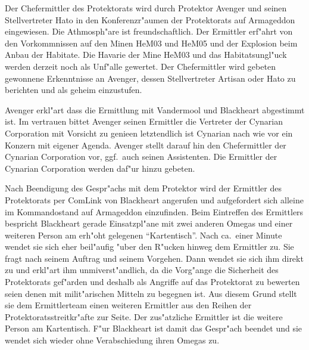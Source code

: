 Der Chefermittler des Protektorats wird durch Protektor Avenger und seinen Stellvertreter Hato in den Konferenzr"aumen der Protektorats auf Armageddon eingewiesen. Die Athmosph"are ist freundschaftlich. Der Ermittler erf"ahrt von den Vorkommnissen auf den Minen HeM03 und HeM05 und der Explosion beim Anbau der Habitate. Die Havarie der Mine HeM03 und das Habitatsungl"uck werden derzeit noch als Unf"alle gewertet. Der Chefermittler wird gebeten gewonnene Erkenntnisse an Avenger, dessen Stellvertreter Artisan oder Hato zu berichten und als geheim einzustufen.

Avenger erkl"art dass die Ermittlung mit Vandermool und Blackheart abgestimmt ist. Im vertrauen bittet Avenger seinen Ermittler die Vertreter der Cynarian Corporation mit Vorsicht zu genie\3en letztendlich ist Cynarian nach wie vor ein Konzern mit eigener Agenda. Avenger stellt darauf hin den Chefermittler der Cynarian Corporation vor, ggf.~auch seinen Assistenten. Die Ermittler der Cynarian Corporation werden daf"ur hinzu gebeten.

Nach Beendigung des Gespr"achs mit dem Protektor wird der Ermittler des Protektorats per ComLink von Blackheart angerufen und aufgefordert sich alleine im Kommandostand auf Armageddon einzufinden. Beim Eintreffen des Ermittlers bespricht Blackheart gerade Einsatzpl"ane mit zwei anderen Omegas und einer weiteren Person am erh"oht gelegenen ``Kartentisch''. Nach ca.~einer Minute  wendet sie sich eher beil"aufig "uber den R"ucken hinweg dem Ermittler zu. Sie fragt nach seinem Auftrag und seinem Vorgehen. Dann wendet sie sich ihm direkt zu und erkl"art ihm unmi\3verst"andlich, da\3 die Vorg"ange die Sicherheit des Protektorats gef"arden und deshalb als Angriffe auf das Protektorat zu bewerten seien denen mit milit"arischen Mitteln zu begegnen ist. Aus diesem Grund stellt sie dem Ermittlerteam einen weiteren Ermittler aus den Reihen der Protektoratsstreitkr"afte zur Seite. Der zus"atzliche Ermittler ist die weitere Person am Kartentisch. F"ur Blackheart ist damit das Gespr"ach beendet und sie wendet sich wieder ohne Verabschiedung ihren Omegas zu.

